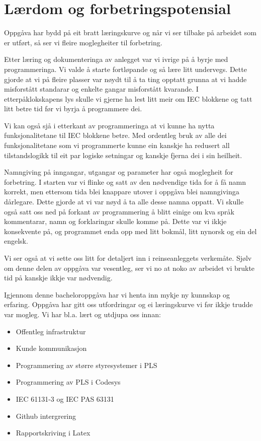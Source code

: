 \section{Lærdom og forbetringspotensial}
\thispagestyle{fancy}

Oppgåva har bydd på eit bratt læringskurve og når vi ser tilbake på arbeidet som er utført, 
så ser vi fleire moglegheiter til forbetring.

Etter læring og dokumenteringa av anlegget var vi ivrige på å byrje med programmeringa.
Vi valde å starte fortløpande og så lære litt undervegs.
Dette gjorde at vi på fleire plasser var nøydt til å ta ting opptatt grunna at vi hadde misforstått standarar og enkelte gangar misforstått kvarande.
I etterpåklokskapens lys skulle vi gjerne ha lest litt meir om \gls{IEC} blokkene og tatt litt betre tid før vi byrja å programmere dei.

Vi kan også sjå i etterkant av programmeringa at vi kunne ha nytta funksjonalitetane til \gls{IEC} blokkene betre.
Med ordentleg bruk av alle dei funksjonalitetane som vi programmerte kunne ein kanskje ha redusert all tilstandslogikk
til eit par logiske setningar og kanskje fjerna dei i sin heilheit.

Namngiving på inngangar, utgangar og parameter har også moglegheit for forbetring.
I starten var vi flinke og satt av den nødvendige tida for å få namn korrekt, men ettersom tida blei knappare utover i oppgåva
blei namngivinga dårlegare. Dette gjorde at vi var nøyd å ta alle desse namna oppatt. \newline
Vi skulle også satt oss ned på forkant av programmering å blitt einige om kva språk kommentarar, namn og forklaringar skulle komme på.
Dette var vi ikkje konsekvente på, og programmet enda opp med litt bokmål, litt nynorsk og ein del engelsk.

Vi ser også at vi sette oss litt for detaljert inn i reinseanleggets verkemåte.
Sjølv om denne delen av oppgåva var vesentleg, ser vi no at noko av arbeidet vi brukte tid på kanskje ikkje var nødvendig.

Igjennom denne bacheloroppgåva har vi henta inn mykje ny kunnskap og erfaring.
Oppgåva har gitt oss utfordringar og ei læringskurve vi før ikkje trudde var mogleg.
Vi har bl.a. lært og utdjupa oss innan:

\begin{itemize}
    \item Offentleg infrastruktur
    \item Kunde kommunikasjon
    \item Programmering av større styresystemer i \gls{PLS}
    \item Programmering av \gls{PLS} i \gls{Codesys}
    \item \gls{IEC} 61131-3 og \gls{IEC} \gls{PAS} 63131
    \item Github intergrering
    \item Rapportskriving i Latex
\end{itemize}






